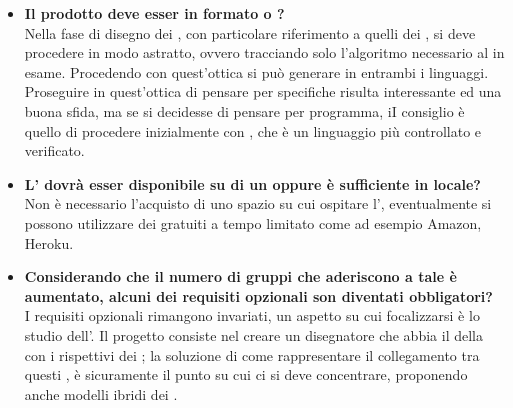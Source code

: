 \begin{itemize}
		   	 \item
	   	 \textbf{Il  prodotto deve esser in formato  o ?\\}
	   	 \justifying
	   	 Nella fase di disegno dei , con particolare riferimento a quelli dei , si deve procedere in modo astratto, ovvero tracciando solo l'algoritmo necessario al  in esame. Procedendo con quest'ottica si può generare  in entrambi i linguaggi. Proseguire in quest'ottica di pensare per specifiche risulta interessante ed una buona sfida, ma se si decidesse di pensare per programma, iI consiglio è quello di procedere inizialmente con , che è un linguaggio più controllato e verificato.\\
		
		   	 \item
	   	 \textbf{L' dovrà esser disponibile su di un  oppure è sufficiente in locale?\\}
	   	\justifying
	   	 Non è necessario l'acquisto di uno spazio su cui ospitare l', eventualmente si possono utilizzare dei  gratuiti a tempo limitato come ad esempio Amazon, Heroku.\\
		
		\item
	   	 \textbf{Considerando che il numero di gruppi che aderiscono a tale  è aumentato, alcuni dei requisiti opzionali son diventati obbligatori?\\}
	   	\justifying
	   	I requisiti opzionali rimangono invariati, un aspetto su cui focalizzarsi è lo studio dell'. Il progetto consiste nel creare un disegnatore che abbia il  della  con i rispettivi  dei ; la soluzione di come rappresentare il collegamento tra questi , è sicuramente il punto su cui ci si deve concentrare, proponendo anche modelli ibridi dei .\\
	   	 

\end{itemize}
